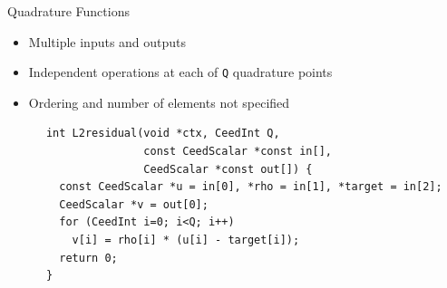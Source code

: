 \documentclass[aspectratio=169]{beamer}
\begin{document}
\begin{frame}[fragile]{Quadrature Functions}
  \begin{itemize}
  \item Multiple inputs and outputs
  \item Independent operations at each of \texttt{Q} quadrature points
  \item Ordering and number of elements not specified
  \end{itemize}
  \begin{minipage}{0.5\textwidth}
    \begin{verbatim}
      int L2residual(void *ctx, CeedInt Q,
                     const CeedScalar *const in[],
                     CeedScalar *const out[]) {
        const CeedScalar *u = in[0], *rho = in[1], *target = in[2];
        CeedScalar *v = out[0];
        for (CeedInt i=0; i<Q; i++)
          v[i] = rho[i] * (u[i] - target[i]);
        return 0;
      }
    \end{verbatim}
  \end{minipage}
\end{frame}
\end{document}
